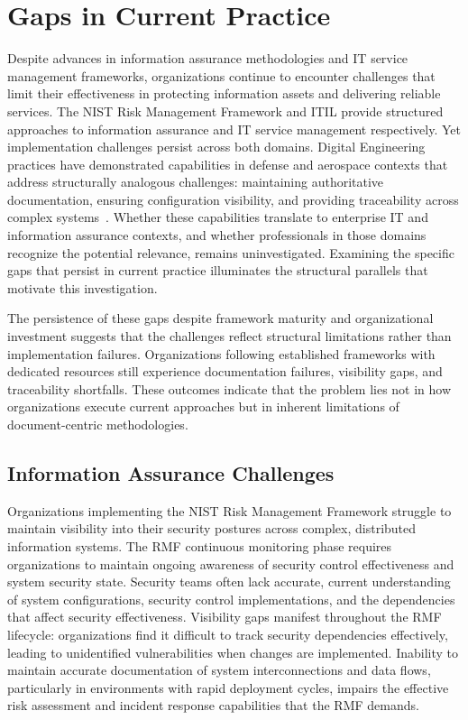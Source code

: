 \section{Gaps in Current Practice}

Despite advances in information assurance methodologies and IT service management frameworks, organizations continue to encounter challenges that limit their effectiveness in protecting information assets and delivering reliable services. The NIST Risk Management Framework and ITIL provide structured approaches to information assurance and IT service management respectively. Yet implementation challenges persist across both domains. Digital Engineering practices have demonstrated capabilities in defense and aerospace contexts that address structurally analogous challenges: maintaining authoritative documentation, ensuring configuration visibility, and providing traceability across complex systems~\parencite{DoD_DE_Strategy_2018}. Whether these capabilities translate to enterprise IT and information assurance contexts, and whether professionals in those domains recognize the potential relevance, remains uninvestigated. Examining the specific gaps that persist in current practice illuminates the structural parallels that motivate this investigation.

The persistence of these gaps despite framework maturity and organizational investment suggests that the challenges reflect structural limitations rather than implementation failures. Organizations following established frameworks with dedicated resources still experience documentation failures, visibility gaps, and traceability shortfalls. These outcomes indicate that the problem lies not in how organizations execute current approaches but in inherent limitations of document-centric methodologies.

\subsection{Information Assurance Challenges}

Organizations implementing the NIST Risk Management Framework struggle to maintain visibility into their security postures across complex, distributed information systems. The RMF continuous monitoring phase requires organizations to maintain ongoing awareness of security control effectiveness and system security state. Security teams often lack accurate, current understanding of system configurations, security control implementations, and the dependencies that affect security effectiveness. Visibility gaps manifest throughout the RMF lifecycle: organizations find it difficult to track security dependencies effectively, leading to unidentified vulnerabilities when changes are implemented. Inability to maintain accurate documentation of system interconnections and data flows, particularly in environments with rapid deployment cycles, impairs the effective risk assessment and incident response capabilities that the RMF demands.

